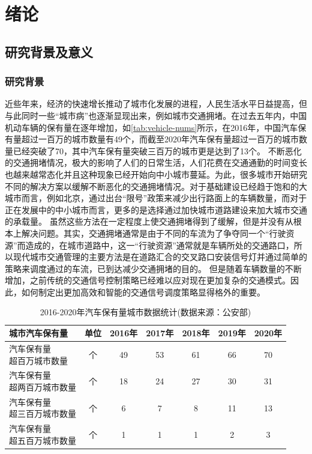 
\chapter{绪论}
\section{研究背景及意义}
\subsection{研究背景}
近些年来，经济的快速增长推动了城市化发展的进程，人民生活水平日益提高，但与此同时一些“城市病”也逐渐显现出来，例如城市交通拥堵。在过去五年内，中国机动车辆的保有量在逐年增加，如\autoref{tab:vehicle-nums}所示，在2016年，中国汽车保有量超过一百万的城市数量有49个，而截至2020年汽车保有量超过一百万的城市数量已经突破了70，其中汽车保有量突破三百万的城市更是达到了13个。
不断恶化的交通拥堵情况，极大的影响了人们的日常生活，人们花费在交通通勤的时间变长也越来越常态化并且这种现象已经开始向中小城市蔓延。为此，很多城市开始研究不同的解决方案以缓解不断恶化的交通拥堵情况。对于基础建设已经趋于饱和的大城市而言，例如北京，通过出台“限号”政策来减少出行路面上的车辆数量，而对于正在发展中的中小城市而言，更多的是选择通过加快城市道路建设来加大城市交通的承载量。
虽然这些方法在一定程度上使交通拥堵得到了缓解，但是并没有从根本上解决问题。其实，交通拥堵通常是由于不同的车流为了争夺同一个“行驶资源”而造成的，在城市道路中，这一“行驶资源”通常就是车辆所处的交通路口，所以现代城市交通管理的主要方法是在道路汇合的交叉路口安装信号灯并通过简单的策略来调度通过的车流，已到达减少交通拥堵的目的。
但是随着车辆数量的不断增加，之前传统的交通信号控制策略已经难以应对现在更加复杂的交通模式。因此，如何制定出更加高效和智能的交通信号调度策略显得格外的重要。

\begin{table}[htb]
    \caption{2016-2020年汽车保有量城市数据统计(数据来源：公安部)\label{tab:vehicle-nums}}
    \begin{tabular}{lcccccc}
      \toprule
      城市汽车保有量 & 单位 & 2016年 & 2017年 & 2018年 & 2019年 & 2020年 \\
      \midrule
      \tabincell{l}{汽车保有量\\超百万城市数量} & 个 & 49 & 53 & 61 & 66 & 70 \\
      \hline
      \tabincell{l}{汽车保有量\\超两百万城市数量} & 个 & 18 & 24 & 27 & 30 & 31 \\
      \hline
      \tabincell{l}{汽车保有量\\超三百万城市数量} & 个 & 6  & 7 & 8 & 11 & 13 \\
      \hline
      \tabincell{l}{汽车保有量\\超五百万城市数量} & 个 & 1  & 1 & 1 & 2 & 3 \\
      \bottomrule
    \end{tabular}
\end{table}


